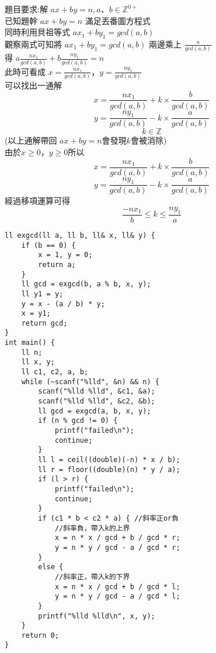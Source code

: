 題目要求:解 $ax+by=n, a、b \in \mathbb{Z}^{0+}$\\
已知題幹 $ax+by=n$ 滿足丟番圖方程式\\
同時利用貝祖等式 $ax_1 + by_1 = gcd(a, b)$\\
觀察兩式可知將 $ax_1 + by_1 = gcd(a, b)$ 兩邊乘上 $\frac{n}{gcd(a, b)}$\\
得 $a\frac{nx_1}{gcd(a, b)} + b\frac{ny_1}{gcd(a, b)} = n$\\
此時可看成 $x = \frac{nx_1}{gcd(a, b)}$，$y = \frac{ny_1}{gcd(a, b)}$\\
可以找出一通解\\
$$x = \frac{nx_1}{gcd(a, b)} + k \times \frac{b}{gcd(a, b)}$$
$$y = \frac{ny_1}{gcd(a, b)} - k \times \frac{a}{gcd(a, b)}$$
$$k \in \mathbb{Z}$$
(以上通解帶回 $ax + by = n$會發現$k$會被消除)\\
$由於x \geq 0，y \geq 0$所以
$$x = \frac{nx_1}{gcd(a, b)} + k \times \frac{b}{gcd(a, b)}$$
$$y = \frac{ny_1}{gcd(a, b)} - k \times \frac{a}{gcd(a, b)}$$
經過移項運算可得
$$\frac{-nx_1}{b} \leq k \leq \frac{ny_1}{a}$$
\begin{lstlisting}
ll exgcd(ll a, ll b, ll& x, ll& y) {
    if (b == 0) {
        x = 1, y = 0;
        return a;
    }
    ll gcd = exgcd(b, a % b, x, y);
    ll y1 = y;
    y = x - (a / b) * y;
    x = y1;
    return gcd;
}
int main() {
    ll n;
    ll x, y;
    ll c1, c2, a, b;
    while (~scanf("%lld", &n) && n) {
        scanf("%lld %lld", &c1, &a);
        scanf("%lld %lld", &c2, &b);
        ll gcd = exgcd(a, b, x, y);
        if (n % gcd != 0) {
            printf("failed\n");
            continue;
        }
        ll l = ceil((double)(-n) * x / b);
        ll r = floor((double)(n) * y / a);
        if (l > r) {
            printf("failed\n");
            continue;
        }
        if (c1 * b < c2 * a) { //斜率正or負
            //斜率負，帶入k的上界
            x = n * x / gcd + b / gcd * r;
            y = n * y / gcd - a / gcd * r;
        }
        else {
            //斜率正，帶入k的下界
            x = n * x / gcd + b / gcd * l;
            y = n * y / gcd - a / gcd * l;
        }
        printf("%lld %lld\n", x, y);
    }
    return 0;
}
\end{lstlisting}